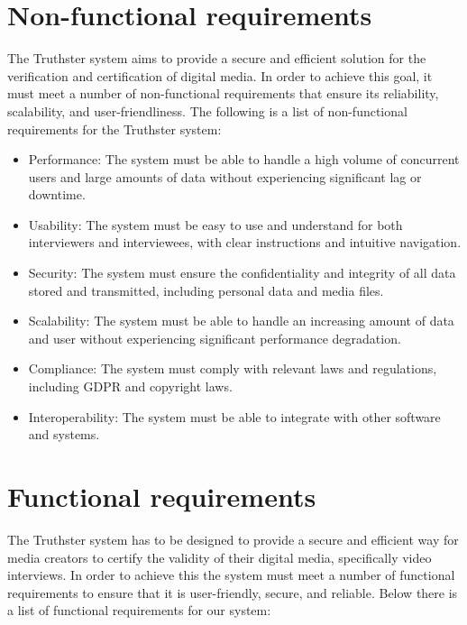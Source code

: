 \documentclass[target=mst,aauheader=]{thud}
\begin{document}
\section{Non-functional requirements}

The Truthster system aims to provide a secure and efficient solution for the verification and certification of digital media. In order to achieve this goal, it must meet a number of non-functional requirements that ensure its reliability, scalability, and user-friendliness. The following is a list of non-functional requirements for the Truthster system:\\

\begin{itemize}

    \item Performance: The system must be able to handle a high volume of concurrent users and large amounts of data without experiencing significant lag or downtime.
    \item Usability: The system must be easy to use and understand for both interviewers and interviewees, with clear instructions and intuitive navigation.
    \item Security: The system must ensure the confidentiality and integrity of all data stored and transmitted, including personal data and media files.
    \item Scalability: The system must be able to handle an increasing amount of data and user without experiencing significant performance degradation.
    \item Compliance: The system must comply with relevant laws and regulations, including GDPR and copyright laws.
    \item Interoperability: The system must be able to integrate with other software and systems.

\end{itemize}

\section{Functional requirements}

The Truthster system has to be designed to provide a secure and efficient way for media creators to certify the validity of their digital media, specifically video interviews. In order to achieve this the system must meet a number of functional requirements to ensure that it is user-friendly, secure, and reliable. 
Below there is a list of functional requirements for our system:
\end{document}
